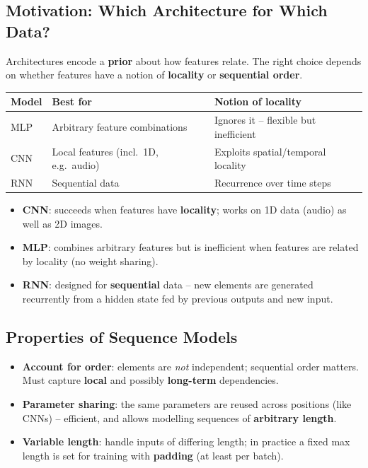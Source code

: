 \documentclass[10pt,a4paper]{article}
\begin{document}
	\subsection{Motivation: Which Architecture for Which Data?}

	\begin{definitionbox}
		Architectures encode a \textbf{prior} about how features relate. The right choice depends on whether features have a notion of \textbf{locality} or \textbf{sequential order}.
	\end{definitionbox}

	\begin{center}
		\begin{tabular}{lll}
			\toprule
			Model & Best for & Notion of locality \\
			\midrule
			MLP & Arbitrary feature combinations & Ignores it -- flexible but inefficient \\
			CNN & Local features (incl.\ 1D, e.g.\ audio) & Exploits spatial/temporal locality \\
			RNN & Sequential data & Recurrence over time steps \\
			\bottomrule
		\end{tabular}
	\end{center}

	\begin{itemize}[leftmargin=*]
		\item \textbf{CNN}: succeeds when features have \textbf{locality}; works on 1D data (audio) as well as 2D images.
		\item \textbf{MLP}: combines arbitrary features but is inefficient when features are related by locality (no weight sharing).
		\item \textbf{RNN}: designed for \textbf{sequential} data -- new elements are generated recurrently from a hidden state fed by previous outputs and new input.
	\end{itemize}

	\subsection{Properties of Sequence Models}

	\begin{itemize}[leftmargin=*]
		\item \textbf{Account for order}: elements are \emph{not} independent; sequential order matters. Must capture \textbf{local} and possibly \textbf{long-term} dependencies.
		\item \textbf{Parameter sharing}: the same parameters are reused across positions (like CNNs) -- efficient, and allows modelling sequences of \textbf{arbitrary length}.
		\item \textbf{Variable length}: handle inputs of differing length; in practice a fixed max length is set for training with \textbf{padding} (at least per batch).
	\end{itemize}
\end{document}
